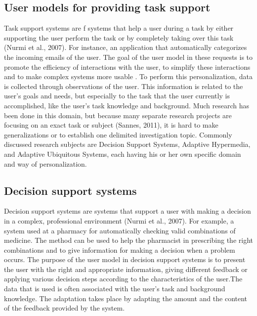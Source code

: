 \subsection{User models for providing task support}

Task support systems are f systems that help a user during a task by either
supporting the user perform the task or by completely taking over this task
\cite{brun2010compass}(Nurmi et al., 2007). For instance,  an application that
automatically categorizes the incoming emails of the user. The goal of the user
model in these requests is to promote the efficiency of interactions with the
user, to simplify these interactions and to make complex systems more usable
\cite{razmerita2009user}\cite{fischer2001user}.
To perform this personalization, data is
collected through observations of the user. This information is related to the
user’s goals and needs, but especially to the task that the user currently is
accomplished, like the user’s task knowledge and background. Much research has
been done in this domain, but because many separate research projects are
focusing on an exact task or subject \cite{}(Sannes, 2011), it is hard to make
generalizations or to establish one delimited investigation topic. Commonly
discussed research subjects are Decision Support Systems,  Adaptive Hypermedia,
and Adaptive Ubiquitous Systems, each having his or her own specific domain and
way of personalization.

\subsection{Decision support systems}

Decision support systems are systems that support a user with making a decision
in a complex, professional environment \cite{} (Nurmi et al., 2007). For example,  a
system used at a pharmacy for automatically checking valid combinations of
medicine. The method can be used to help the pharmacist in prescribing the right
combinations and to give information for making a decision when a problem
occurs.  The purpose of the user model in decision support systems is to present
the user with the right and appropriate information, giving different feedback
or applying various decision steps according to the characteristics of the
user.The data that is used is often associated with the user’s task and
background knowledge.    The adaptation takes place by adapting the amount and
the content of the feedback provided by the system.


